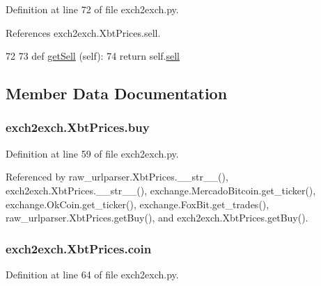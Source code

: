 Definition at line 72 of file exch2exch.\-py.



References exch2exch.\-Xbt\-Prices.\-sell.


\begin{DoxyCode}
72 
73     \textcolor{keyword}{def }\hyperlink{classexch2exch_1_1_xbt_prices_abcd54a52079952f45b5f29f3ffcd83b5}{getSell} (self):
74         \textcolor{keywordflow}{return} self.\hyperlink{classexch2exch_1_1_xbt_prices_a06fd0cfb03d485af3364a0d86fbe5385}{sell}
        
\end{DoxyCode}


\subsection{Member Data Documentation}
\hypertarget{classexch2exch_1_1_xbt_prices_a8f1d8ac0ef114ea3645314578697b7ac}{
\subsubsection[{buy}]{\setlength{\rightskip}{0pt plus 5cm}exch2exch.\-Xbt\-Prices.\-buy}}\label{classexch2exch_1_1_xbt_prices_a8f1d8ac0ef114ea3645314578697b7ac}


Definition at line 59 of file exch2exch.\-py.



Referenced by raw\-\_\-urlparser.\-Xbt\-Prices.\-\_\-\-\_\-str\-\_\-\-\_\-(), exch2exch.\-Xbt\-Prices.\-\_\-\-\_\-str\-\_\-\-\_\-(), exchange.\-Mercado\-Bitcoin.\-get\-\_\-ticker(), exchange.\-Ok\-Coin.\-get\-\_\-ticker(), exchange.\-Fox\-Bit.\-get\-\_\-trades(), raw\-\_\-urlparser.\-Xbt\-Prices.\-get\-Buy(), and exch2exch.\-Xbt\-Prices.\-get\-Buy().

\hypertarget{classexch2exch_1_1_xbt_prices_a1191c8825e8f1333b4100b89fa2be053}{
\subsubsection[{coin}]{\setlength{\rightskip}{0pt plus 5cm}exch2exch.\-Xbt\-Prices.\-coin}}\label{classexch2exch_1_1_xbt_prices_a1191c8825e8f1333b4100b89fa2be053}


Definition at line 64 of file exch2exch.\-py.



